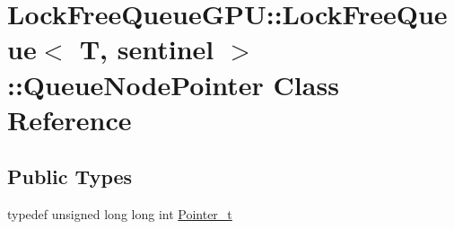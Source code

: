 \hypertarget{class_lock_free_queue_g_p_u_1_1_lock_free_queue_1_1_queue_node_pointer}{}\section{Lock\+Free\+Queue\+G\+PU\+:\+:Lock\+Free\+Queue$<$ T, sentinel $>$\+:\+:Queue\+Node\+Pointer Class Reference}
\label{class_lock_free_queue_g_p_u_1_1_lock_free_queue_1_1_queue_node_pointer}
\subsection*{Public Types}
\begin{DoxyCompactItemize}
\item 
typedef unsigned long long int \mbox{\hyperlink{class_lock_free_queue_g_p_u_1_1_lock_free_queue_1_1_queue_node_pointer_a5eb055dfbc4fd3ae549748372a029455}{Pointer\+\_\+t}}
\end{DoxyCompactItemize}
